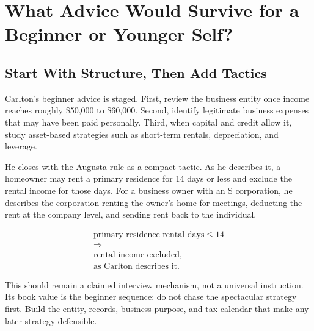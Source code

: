 \documentclass[11pt,oneside]{book}
\begin{document}
\chapter{What Advice Would Survive for a Beginner or Younger Self?}

\section{Start With Structure, Then Add Tactics}

Carlton's beginner advice is staged. First, review the business entity once income reaches roughly \$50,000 to \$60,000. Second, identify legitimate business expenses that may have been paid personally. Third, when capital and credit allow it, study asset-based strategies such as short-term rentals, depreciation, and leverage.

He closes with the Augusta rule as a compact tactic. As he describes it, a homeowner may rent a primary residence for 14 days or less and exclude the rental income for those days. For a business owner with an S corporation, he describes the corporation renting the owner's home for meetings, deducting the rent at the company level, and sending rent back to the individual.

\begin{equation}
\begin{gathered}
\text{primary-residence rental days}\leq 14\\
\Longrightarrow\\
\text{rental income excluded,}\\
\text{as Carlton describes it}.
\end{gathered}
\end{equation}

This should remain a claimed interview mechanism, not a universal instruction. Its book value is the beginner sequence: do not chase the spectacular strategy first. Build the entity, records, business purpose, and tax calendar that make any later strategy defensible.

\end{document}
